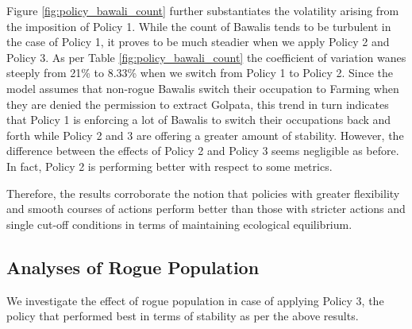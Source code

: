 \documentclass[final,5p,times,twocolumn,authoryear]{elsarticle}
\begin{document}
Figure \ref{fig:policy_bawali_count} further substantiates the volatility arising from the imposition of Policy 1. While the count of Bawalis tends to be turbulent in the case of Policy 1, it proves to be much steadier when we apply Policy 2 and Policy 3. As per Table \ref{fig:policy_bawali_count} the coefficient of variation wanes steeply from 21\% to 8.33\% when we switch from Policy 1 to Policy 2. Since the model assumes that non-rogue Bawalis switch their occupation to Farming when they are denied the permission to extract Golpata, this trend in turn indicates that Policy 1 is enforcing a lot of Bawalis to switch their occupations back and forth while Policy 2 and 3 are offering a greater amount of stability. However, the difference between the effects of Policy 2 and Policy 3 seems negligible as before. In fact, Policy 2 is performing better with respect to some metrics.

Therefore, the results corroborate the notion that policies with greater flexibility and smooth courses of actions perform better than those with stricter actions and single cut-off conditions in terms of maintaining ecological equilibrium.

\subsection{Analyses of Rogue Population}

We investigate the effect of rogue population in case of applying Policy 3, the policy that performed best in terms of stability as per the above results.
\end{document}
